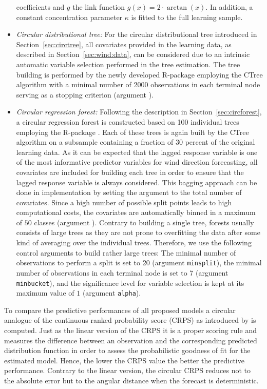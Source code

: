 \documentclass[nojss]{jss}
\numberwithin{equation}{section}
\begin{document}
\begin{itemize}
coefficients and $g$ the link function $g(x) = 2 \cdot \arctan(x)$. In addition, a
constant concentration parameter $\kappa$ is fitted to the full learning sample.
\item \emph{Circular distributional tree:}
For the circular distributional tree introduced in Section~\ref{sec:circtree}, all
covariates provided in the learning data, as described in
Section~\ref{sec:wind:data}, can be considered due to an intrinsic automatic
variable selection performed in the tree estimation. The tree building is
performed by the newly developed R-package  employing the CTree
algorithm \citep{Hothorn+Hornik+Zeileis:2006} with a minimal number of 2000
observations in each terminal node serving as a stopping criterion (argument
).
\item \emph{Circular regression forest:} Following the description in
Section~\ref{sec:circforest}, a circular regression forest is constructed based
on 100 individual trees employing the R-package . Each of these
trees is again built by the CTree algorithm on a subsample containing a
fraction of 30 percent of the original learning data. As it can be expected
that the lagged response variable is one of the most informative predictor
variables for wind direction forecasting, all covariates are included for
building each tree in order to ensure that the lagged response
variable is always considered. This bagging approach can be done in  implementation by
setting the argument  to the total number of covariates. Since a
high number of possible split points leads to high computational costs, the
covariates are automatically binned in a maximum of $50$ classes (argument
). Contrary to building a single tree,
forests usually consists of large trees as they are not prone to overfitting
the data after some kind of averaging over the individual trees. Therefore, we
use the following control arguments to build rather large trees: The minimal number 
of observations to perform a split is set to 20
(argument \texttt{minsplit}), the minimal number of observations in each
terminal node is set to 7 (argument \texttt{minbucket}), and the significance
level for variable selection is kept at its maximum value of $1$
(argument \texttt{alpha}).
\end{itemize}

To compare the predictive performances of all proposed models a circular
analogue of the continuous ranked probability score (CRPS) as introduced by
\cite{Grimit+Gneiting+Berrocal:2006} is computed. Just as the linear version of
the CRPS \citep[for more details see][]{Hersbach:2000} it is a proper scoring
rule \citep{Gneiting+Raftery:2007} and measures the difference between an
observation and the corresponding predicted distribution function in order to
assess the probabilistic goodness of fit for the estimated model. Hence, the
lower the CRPS value the better the predictive performance. Contrary to the
linear version, the circular CRPS reduces not to the absolute error but to the
angular distance when the forecast is deterministic.
\end{document}
